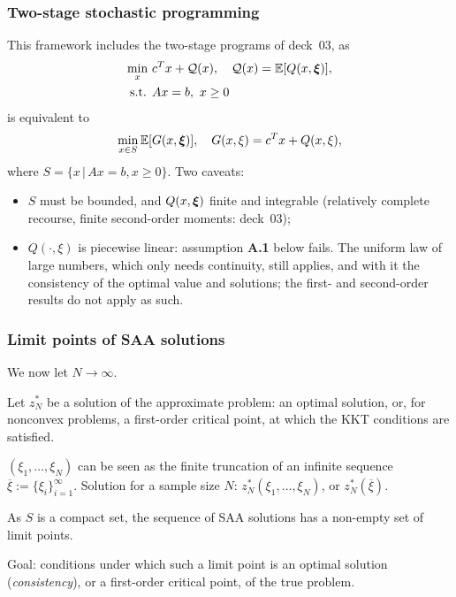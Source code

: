 \documentclass[aspectratio=169]{beamer}
\begin{document}
\begin{frame}
\frametitle{Two-stage stochastic programming}

This framework includes the two-stage programs of deck~03, as
\begin{align*}
\min_x\ & c^Tx + {\mathcal{Q}}(x), \quad {\mathcal{Q}}(x) = {\mathbb{E}}[Q(x,{\boldsymbol{\xi}})], \\
\mbox{s.t. } & Ax = b,\ x \geq 0
\end{align*}
is equivalent to
$$
\min_{x \in S} {\mathbb{E}}[G(x, {\boldsymbol{\xi}})], \quad G(x,\xi) = c^Tx + Q(x,\xi),
$$
where $S = \{ x \,|\, Ax = b, x \geq 0 \}$. Two caveats:
\begin{itemize}
\item
$S$ must be bounded, and $Q(x,{\boldsymbol{\xi}})$ finite and integrable (relatively complete recourse, finite second-order moments: deck~03);
\item
$Q(\cdot,\xi)$ is {\red piecewise linear}: assumption \textbf{A.1} below fails. The uniform law of large numbers, which only needs continuity, still applies, and with it the consistency of the optimal value and solutions; the first- and second-order results do not apply as such.
\end{itemize}

\end{frame}

\begin{frame}
\frametitle{Limit points of SAA solutions}

We now let $N \rightarrow \infty$.

\mbox{}

Let {\red $z_N^*$ be a solution} of the approximate problem: an optimal solution, or, for nonconvex problems, a first-order critical point, at which the KKT conditions are satisfied.

\mbox{}

$(\xi_1,\ldots,\xi_N)$ can be seen as the finite truncation of an infinite sequence $\overline{\xi} := \lbrace \xi_i \rbrace_{i = 1}^{\infty}$.
Solution for a sample size $N$: $z_N^*(\xi_1,\ldots,\xi_N)$, or $z_N^*\left(\overline{\xi}\right)$.

\mbox{}

As $S$ is a compact set, the sequence of SAA solutions has a non-empty set of limit points.

\mbox{}

{\blue Goal: conditions under which such a limit point is an optimal solution ({\it consistency}), or a first-order critical point, of the true problem.}

\end{frame}
\end{document}
